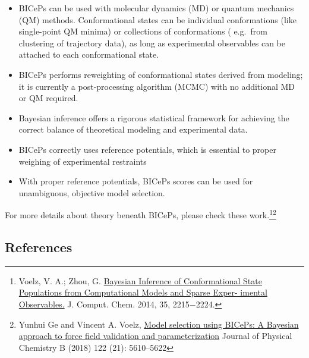 \documentclass[11pt]{article}
\begin{document}
\begin{itemize}
\item
  BICePs can be used with molecular dynamics (MD) or quantum mechanics
  (QM) methods. Conformational states can be individual conformations
  (like single-point QM minima) or collections of conformations (
  e.g.~from clustering of trajectory data), as long as experimental
  observables can be attached to each conformational state.
\item
  BICePs performs reweighting of conformational states derived from
  modeling; it is currently a post-processing algorithm (MCMC) with no
  additional MD or QM required.
\item
  Bayesian inference offers a rigorous statistical framework for
  achieving the correct balance of theoretical modeling and experimental
  data.
\item
  BICePs correctly uses reference potentials, which is essential to
  proper weighing of experimental restraints
\item
  With proper reference potentials, BICePs scores can be used for
  unambiguous, objective model selection.
\end{itemize}

For more details about theory beneath BICePs, please check these
work.\footnote{Voelz, V. A.; Zhou, G.
  \href{https://onlinelibrary.wiley.com/doi/abs/10.1002/jcc.23738}{Bayesian
  Inference of Conformational State Populations from Computational
  Models and Sparse Exper- imental Observables.} J. Comput. Chem. 2014,
  35, 2215−2224.}\footnote{Yunhui Ge and Vincent A. Voelz,
  \href{https://pubs.acs.org/doi/10.1021/acs.jpcb.7b11871}{Model
  selection using BICePs: A Bayesian approach to force field validation
  and parameterization} Journal of Physical Chemistry B (2018) 122 (21):
  5610--5622}

\hypertarget{references}{%
\subsection{References}\label{references}}


    
    
    
    
\end{document}
